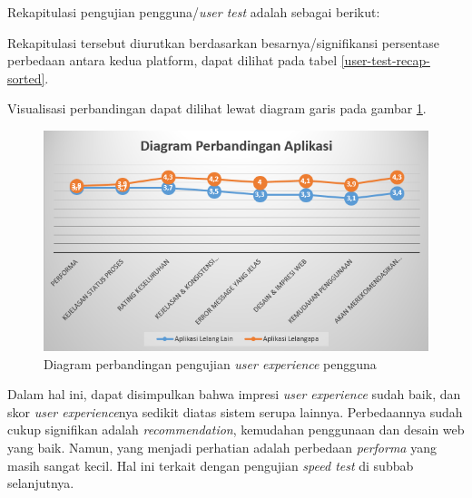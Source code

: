 Rekapitulasi pengujian pengguna/\textit{user test} adalah sebagai berikut:

\indent Rekapitulasi tersebut diurutkan berdasarkan besarnya/signifikansi persentase perbedaan antara kedua platform, dapat dilihat pada tabel \ref{user-test-recap-sorted}.

Visualisasi perbandingan dapat dilihat lewat diagram garis pada gambar \ref{diagram-pengguna-chart}.

\begin{figure}[H]
	\centering
	\includegraphics[width=\textwidth]{images/bab5/ujipengguna/chart.png}
	\caption{Diagram perbandingan pengujian \textit{user experience} pengguna}
	\label{diagram-pengguna-chart}
\end{figure}

Dalam hal ini, dapat disimpulkan bahwa impresi \textit{user experience} sudah baik, dan skor \textit{user experience}nya sedikit diatas sistem serupa lainnya. Perbedaannya sudah cukup signifikan adalah \textit{recommendation}, kemudahan penggunaan dan desain web yang baik. Namun, yang menjadi perhatian adalah perbedaan \textit{performa} yang masih sangat kecil. Hal ini terkait dengan pengujian \textit{speed test} di subbab selanjutnya.